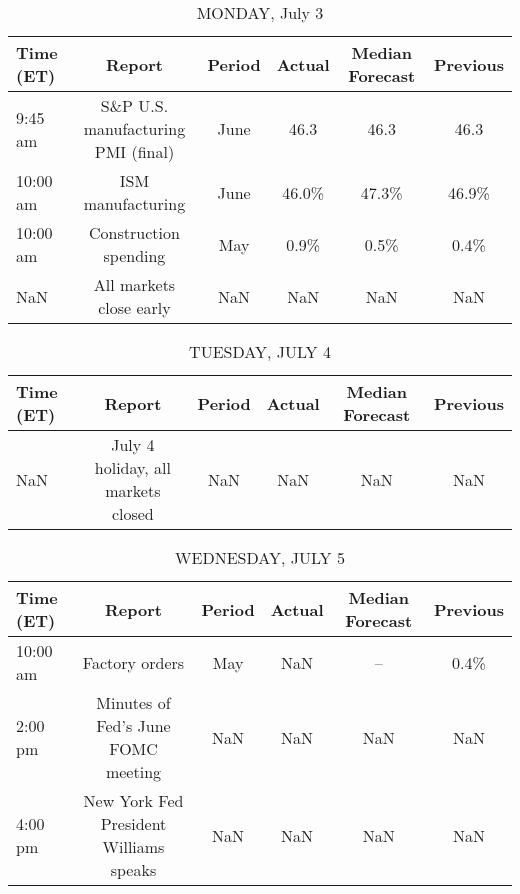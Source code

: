 \documentclass{article}%
\begin{document}
%
\normalsize%


\begin{table}[htbp]%
\caption{MONDAY, July 3}%
\centering%
\begin{adjustbox}{width=1\textwidth}%
\begin{tabular}{lccccc}
\toprule
Time (ET) &                             Report & Period & Actual & Median Forecast & Previous \\
\midrule
  9:45 am & S\&P U.S. manufacturing PMI (final) &   June &   46.3 &            46.3 &     46.3 \\
 10:00 am &                  ISM manufacturing &   June &  46.0\% &           47.3\% &    46.9\% \\
 10:00 am &              Construction spending &    May &   0.9\% &            0.5\% &     0.4\% \\
      NaN &            All markets close early &    NaN &    NaN &             NaN &      NaN \\
\bottomrule
\end{tabular}
%
\end{adjustbox}%
\end{table}

%


\begin{table}[htbp]%
\caption{TUESDAY, JULY 4}%
\centering%
\begin{adjustbox}{width=1\textwidth}%
\begin{tabular}{lccccc}
\toprule
Time (ET) &                             Report & Period & Actual & Median Forecast & Previous \\
\midrule
      NaN & July 4 holiday, all markets closed &    NaN &    NaN &             NaN &      NaN \\
\bottomrule
\end{tabular}
%
\end{adjustbox}%
\end{table}

%


\begin{table}[htbp]%
\caption{WEDNESDAY, JULY 5}%
\centering%
\begin{adjustbox}{width=1\textwidth}%
\begin{tabular}{lccccc}
\toprule
Time (ET) &                                 Report & Period & Actual & Median Forecast & Previous \\
\midrule
 10:00 am &                         Factory orders &    May &    NaN &              -- &     0.4\% \\
  2:00 pm &     Minutes of Fed's June FOMC meeting &    NaN &    NaN &             NaN &      NaN \\
  4:00 pm & New York Fed President Williams speaks &    NaN &    NaN &             NaN &      NaN \\
\bottomrule
\end{tabular}
%
\end{adjustbox}%
\end{table}
\end{document}
